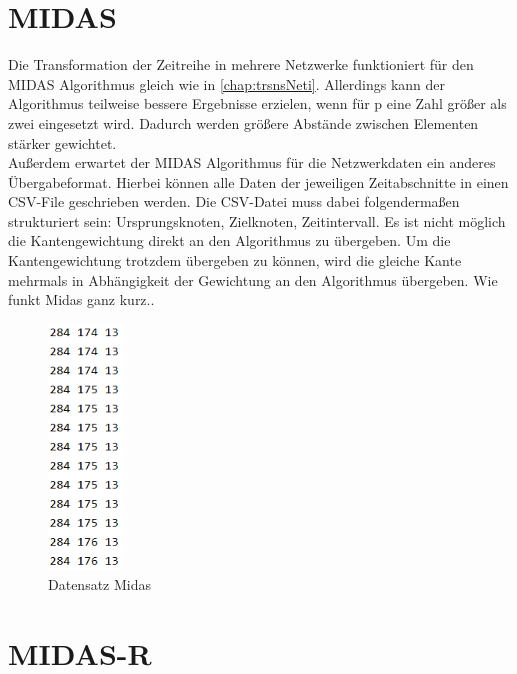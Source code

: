 \section{MIDAS}
\label{chap:trsnsMidas}
Die Transformation der Zeitreihe in mehrere Netzwerke funktioniert für den MIDAS Algorithmus gleich wie in \autoref{chap:trsnsNeti}. Allerdings kann der Algorithmus teilweise bessere Ergebnisse erzielen, wenn für p eine Zahl größer als zwei eingesetzt wird. Dadurch werden größere Abstände zwischen Elementen stärker gewichtet.\\
Außerdem erwartet der MIDAS Algorithmus für die Netzwerkdaten ein anderes Übergabeformat. Hierbei können alle Daten der jeweiligen Zeitabschnitte in einen CSV-File geschrieben werden. Die CSV-Datei muss dabei folgendermaßen strukturiert sein: Ursprungsknoten, Zielknoten, Zeitintervall. Es ist nicht möglich die Kantengewichtung direkt an den Algorithmus zu übergeben. Um die Kantengewichtung trotzdem übergeben zu können, wird die gleiche Kante mehrmals in Abhängigkeit der Gewichtung an den Algorithmus übergeben.
Wie funkt Midas ganz kurz..


\begin{figure}[H]
	\centering
	\includegraphics[width=2cm]{fig/tsToNet/midasData}
	\caption{Datensatz Midas}
	\label{img:tsToNetMiData}
\end{figure}


\section{MIDAS-R}
\label{chap:trsnsMidasR}
